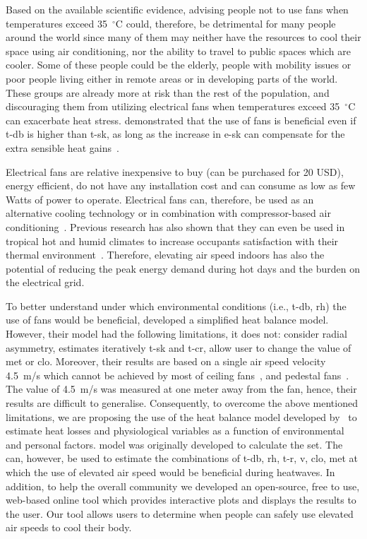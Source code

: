 Based on the available scientific evidence, advising people not to use fans when temperatures exceed 35~$^{\circ}$C could, therefore, be detrimental for many people around the world since many of them may neither have the resources to cool their space using air conditioning, nor the ability to travel to public spaces which are cooler.
Some of these people could be the elderly, people with mobility issues or poor people living either in remote areas or in developing parts of the world.
These groups are already more at risk than the rest of the population, and discouraging them from utilizing electrical fans when temperatures exceed 35~$^{\circ}$C can exacerbate heat stress.
 demonstrated that the use of fans is beneficial even if \ac{t-db} is higher than \ac{t-sk}, as long as the increase in \ac{e-sk} can compensate for the extra sensible heat gains~\cite{Jay2015}.

Electrical fans are relative inexpensive to buy (can be purchased for 20 USD), energy efficient, do not have any installation cost and can consume as low as few Watts of power to operate.
Electrical fans can, therefore, be used as an alternative cooling technology or in combination with compressor-based air conditioning~\cite{Jay2019a, Yang2015a}.
Previous research has also shown that they can even be used in tropical hot and humid climates to increase occupants satisfaction with their thermal environment~\cite{Lipczynska2018a}.
Therefore, elevating air speed indoors has also the potential of reducing the peak energy demand during hot days and the burden on the electrical grid.

To better understand under which environmental conditions (i.e., \ac{t-db}, \ac{rh}) the use of fans would be beneficial,  developed a simplified heat balance model.
However, their model had the following limitations, it does not: consider radial asymmetry, estimates iteratively \ac{t-sk} and \ac{t-cr}, allow user to change the value of \ac{met} or \ac{clo}.
Moreover, their results are based on a single air speed velocity 4.5~m/s which cannot be achieved by most of ceiling fans~\cite{Raftery2019}, and pedestal fans~\cite{Yang2015a}.
The value of 4.5~m/s was measured at one meter away from the fan, hence, their results are difficult to generalise.
Consequently, to overcome the above mentioned limitations, we are proposing the use of the heat balance model developed by~ to estimate heat losses and physiological variables as a function of environmental and personal factors.
 model was originally developed to calculate the \ac{set}.
The  can, however, be used to estimate the combinations of \ac{t-db}, \ac{rh}, \ac{t-r}, \ac{v}, \ac{clo}, \ac{met} at which the use of elevated air speed would be beneficial during heatwaves.
In addition, to help the overall community we developed an open-source, free to use, web-based online tool which provides interactive plots and displays the results to the user.
Our tool allows users to determine when people can safely use elevated air speeds to cool their body.

